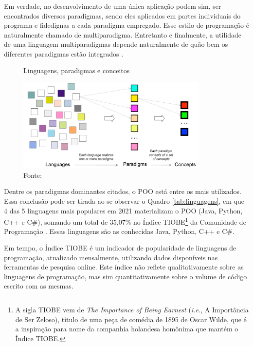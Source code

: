 Em verdade, no desenvolvimento de uma única aplicação podem sim, ser
encontrados diversos paradigmas, sendo eles aplicados em partes individuais do
programa e fidedignas a cada paradigma empregado. Esse estilo de programação é
naturalmente chamado de multiparadigma. Entretanto e finalmente, a utilidade de
uma linguagem multiparadigmas depende naturalmente de quão bem os diferentes
paradigmas estão integrados \cite{bjarne_1995,van_roy_2004}.

\begin{figure}[!htb]
  \centering
  \caption{Linguagens, paradigmas e conceitos}
  \includegraphics[width=0.85\textwidth]{../figures/concepts.png}
  \caption*{Fonte: }
  \label{fig:concepts}
\end{figure}

Dentre os paradigmas dominantes citados, o POO está entre os mais utilizados.
Essa conclusão pode ser tirada ao se observar o Quadro \ref{tab:linguagens}, em
que 4 das 5 linguagens mais populares em 2021 materializam o POO (Java, Python,
C++ e C\#), somando um total de 35,07\% no Índice TIOBE\footnote{A sigla TIOBE
  vem de \textit{The Importance of Being Earnest} (\textit{i.e.}, A Importância de
  Ser Zeloso), título de uma peça de comédia de 1895 de Oscar Wilde, que é a
  inspiração para nome da companhia holandesa homônima que mantém o Índice TIOBE.}
da Comunidade de Programação \cite{tiobe_2021}. Essas linguagens são as
conhecidas Java, Python, C++ e C\#.

Em tempo, o Índice TIOBE é um indicador de popularidade de linguagens de
programação, atualizado mensalmente, utilizando dados disponíveis nas
ferramentas de pesquisa online. Este índice não reflete qualitativamente sobre
as linguagens de programação, mas sim quantitativamente sobre o volume de código
escrito com as mesmas.

